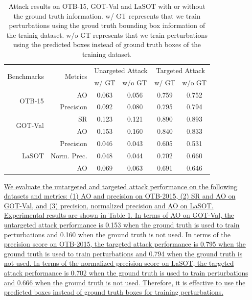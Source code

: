 \documentclass[12pt]{article}
\begin{document}
\begin{table}[t]
  \renewcommand\thetable{IX}
  \centering
  \caption{Attack results on OTB-15, GOT-Val and LaSOT with or without the ground truth information. w/ GT represents that we train perturbations using the groud truth bounding box information of the trainig dataset. w/o GT represents that we train perturbations using the predicted boxes instead of ground truth boxes of the training dataset.}
  \begin{tabular}{rrcccc}
  \toprule
  \multirow{2}{*}[-2pt]{Benchmarks} & \multirow{2}{*}[-2pt]{Metrics} & \multicolumn{2}{c}{Unargeted Attack} & \multicolumn{2}{c}{Targeted Attack} \\ \cmidrule{3-6}
                              &                          & w/ GT  & \multicolumn{1}{l}{w/o GT}  & w/ GT  & \multicolumn{1}{l}{w/o GT} \\ \midrule
  \multirow{2}{*}{OTB-15}     & AO                       & 0.063  & 0.056                       & 0.759  & 0.752                      \\
                              & Precision                & 0.092  & 0.080                       & 0.795  & 0.794                      \\ \midrule
  \multirow{2}{*}{GOT-Val}    & SR                       & 0.123  & 0.121                       & 0.890  & 0.893                      \\
                              & AO                       & 0.153  & 0.160                       & 0.840  & 0.833                      \\ \midrule
  \multirow{3}{*}{LaSOT}      & Precision                & 0.046  & 0.043                       & 0.605  & 0.531                      \\
                              & Norm. Prec.              & 0.048  & 0.044                       & 0.702  & 0.660                      \\
                              & AO                       & 0.069  & 0.063                       & 0.691  & 0.646                      \\ \bottomrule
  \end{tabular}
  \label{tab:agent_GT}
\end{table}

\uline{We evaluate the untargeted and targeted attack performance on the following datasets and metrics: (1) AO and precision on OTB-2015, (2) SR and AO on GOT-Val, and (3) precision, normalized precision and AO on LaSOT.
Experimental results are shown in Table \ref{tab:agent_GT}.
In terms of AO on GOT-Val, the untargeted attack performance is 0.153 when the ground truth is used to train perturbations and 0.160 when the ground truth is not used.
In terms of the precision score on OTB-2015, the targeted attack performance is 0.795 when the ground truth is used to train perturbations and 0.794 when the ground truth is not used.
In terms of the normalized precision score on LaSOT, the targeted attack performance is 0.702 when the ground truth is used to train perturbations and 0.666 when the ground truth is not used.
Therefore, it is effective to use the predicted boxes instead of ground truth boxes for training perturbations.
}
\end{document}
